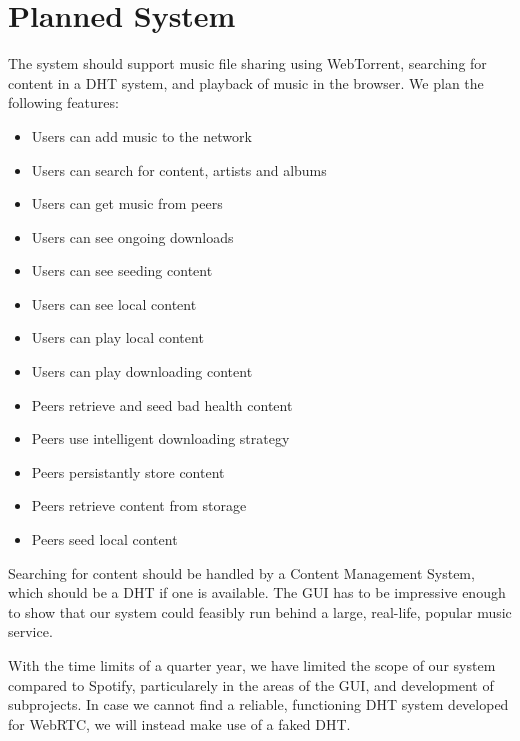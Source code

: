 
\section{Planned System}
The system should support music file sharing using WebTorrent,
searching for content in a DHT system,
and playback of music in the browser.
We plan the following features:

\begin{itemize}
	\item Users can add music to the network
	\item Users can search for content, artists and albums
	\item Users can get music from peers
	\item Users can see ongoing downloads
	\item Users can see seeding content
	\item Users can see local content
	\item Users can play local content
	\item Users can play downloading content
	\item Peers retrieve and seed bad health content
	\item Peers use intelligent downloading strategy
	\item Peers persistantly store content
	\item Peers retrieve content from storage
	\item Peers seed local content
\end{itemize}

Searching for content should be handled by a Content Management System,
which should be a \acs{DHT} if one is available.
The \acs{GUI} has to be impressive enough to show that our system
could feasibly run behind a large, real-life, popular music service.

With the time limits of a quarter year,
we have limited the scope of our system compared to Spotify,
particularely in the areas of the \acs{GUI}, and development of subprojects.
In case we cannot find a reliable, functioning \acs{DHT} system developed for WebRTC,
we will instead make use of a faked \acs{DHT}.

